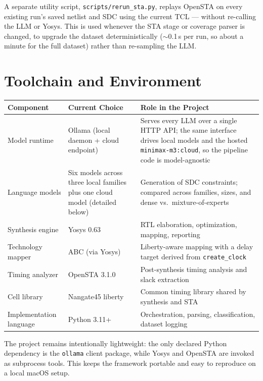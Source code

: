 \documentclass[11pt]{article}
\begin{document}
A separate utility script, \texttt{scripts/rerun\_sta.py}, replays OpenSTA on every existing run's saved netlist and SDC using the current TCL — without re-calling the LLM or Yosys. This is used whenever the STA stage or coverage parser is changed, to upgrade the dataset deterministically ($\sim$0.1\,s per run, so about a minute for the full dataset) rather than re-sampling the LLM.

\section*{Toolchain and Environment}
\begin{table}[h]
\centering
\begin{tabularx}{\textwidth}{>{\raggedright\arraybackslash}p{} >{\raggedright\arraybackslash}p{} X}
\toprule
\textbf{Component} & \textbf{Current Choice} & \textbf{Role in the Project} \\
\midrule
Model runtime & Ollama (local daemon + cloud endpoint) & Serves every LLM over a single HTTP API; the same interface drives local models and the hosted \texttt{minimax-m3:cloud}, so the pipeline code is model-agnostic \\
Language models & Six models across three local families plus one cloud model (detailed below) & Generation of SDC constraints; compared across families, sizes, and dense vs.\ mixture-of-experts \\
Synthesis engine & Yosys 0.63 & RTL elaboration, optimization, mapping, reporting \\
Technology mapper & ABC (via Yosys) & Liberty-aware mapping with a delay target derived from \texttt{create\_clock} \\
Timing analyzer & OpenSTA 3.1.0 & Post-synthesis timing analysis and slack extraction \\
Cell library & Nangate45 liberty & Common timing library shared by synthesis and STA \\
Implementation language & Python 3.11+ & Orchestration, parsing, classification, dataset logging \\
\bottomrule
\end{tabularx}
\end{table}

The project remains intentionally lightweight: the only declared Python dependency is the \texttt{ollama} client package, while Yosys and OpenSTA are invoked as subprocess tools. This keeps the framework portable and easy to reproduce on a local macOS setup.
\end{document}

